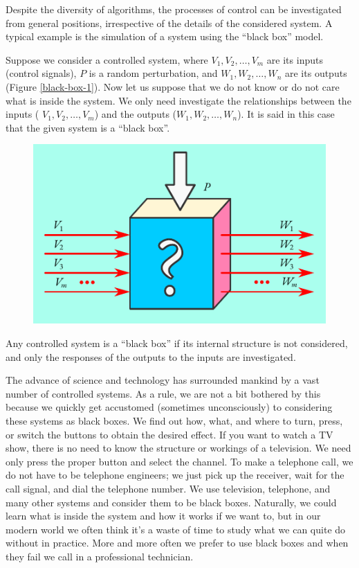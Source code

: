 Despite the diversity of algorithms, the processes of control can be
investigated from general positions, irrespective of the details of the
considered system. A typical example is the simulation of a system using
the ``black box'' model.


 Suppose we consider a controlled system,
where $V_{1}, V_{2}, \ldots , V_{m}$ are its inputs (control signals), $P$ is a random perturbation, and $W_{1}, W_{2}, \ldots , W_{n}$ are its outputs (Figure \ref{black-box-1}). Now let us suppose that we do not know or do not care what is inside the system. We only need investigate the relationships between the inputs ( $V_{1}, V_{2}, \ldots , V_{m}$) and the outputs ($W_{1}, W_{2}, \ldots , W_{n}$). It is said in this case that the given system is a ``black box''.

\begin{figure}[!ht]
 \centering
 \includegraphics[width=0.8\linewidth]{figures/black-box-1.pdf}
 \end{figure}
 
Any controlled system is a ``black box'' if its internal structure is not
considered, and only the responses of the outputs to the inputs are
investigated.



 The advance of science and
technology has surrounded mankind by a vast number of controlled
systems. As a rule, we are not a bit bothered by this because we quickly
get accustomed (sometimes unconsciously) to considering these systems
as black boxes. We find out how, what, and where to turn, press, or
switch the buttons to obtain the desired effect. If you want to watch
a TV show, there is no need to know the structure or workings of
a television. We need only press the proper button and select the
channel. To make a telephone call, we do not have to be telephone
engineers; we just pick up the receiver, wait for the call signal, and dial
the telephone number. We use television, telephone, and many other
systems and consider them to be black boxes. Naturally, we could learn
what is inside the system and how it works if we want to, but in our
modern world we often think it's a waste of time to study what we can
quite do without in practice. More and more often we prefer to use
black boxes and when they fail we call in a professional technician.

